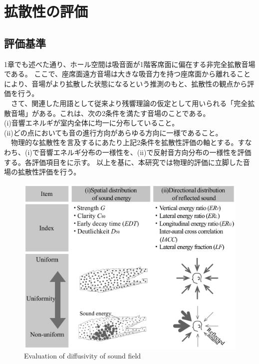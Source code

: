 \chapter{拡散性の評価}

\section{評価基準}
1章でも述べた通り、ホール空間は吸音面が1階客席面に偏在する非完全拡散音場である。
ここで、座席面遠方音場は大きな吸音力を持つ座席面から離れることにより、音場がより拡散した状態になるという推測のもと、拡散性の観点から評価を行う。
\\　さて、関連した用語として従来より残響理論の仮定として用いられる「完全拡散音場」がある。これは、次の2条件を満たす音場のことである。
\\(i)音響エネルギが室内全体に均一に分布していること。
\\(i\hspace{-.05em}i)どの点においても音の進行方向があらゆる方向に一様であること。
\\　物理的な拡散性を言及するにあたり上記2条件を拡散性評価の軸とする。すなわち、(i)で音響エネルギ分布の一様性を、(ii)で反射音方向分布の一様性を評価する。各評価項目をに示す。
以上を基に、本研究では物理的評価に立脚した音場の拡散性評価を行う。
\vspace{0.8cm}
\begin{figure}[htbp]
    \centering
    \includegraphics[keepaspectratio,scale=0.6]{01_att/kakusan.pdf}
    \caption{\hspace{1mm}Evaluation of diffusivity of sound field}
    \label{fig:kakusan}
\end{figure}


